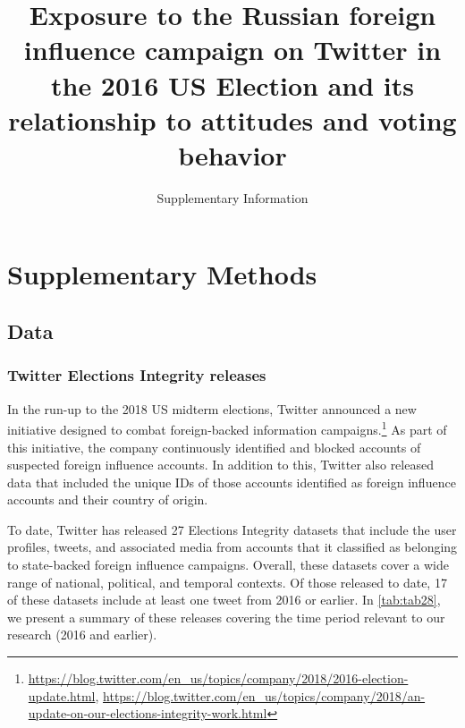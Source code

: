 \documentclass[
  12pt,
]{article}
\title{\Large \textbf{Exposure to the Russian foreign influence campaign on Twitter in the 2016 US Election and its relationship to attitudes and voting behavior}\vspace{2mm}}
\subtitle{\Large Supplementary Information}
\author{}
\date{\vspace{-2.5em}}
\begin{document}
\maketitle

{
\setcounter{tocdepth}{2}
\tableofcontents
}
\renewcommand{\figureautorefname}{Supplementary Figure}
\renewcommand{\tableautorefname}{Supplementary Table}

\clearpage

\hypertarget{supplementary-methods}{%
\section{Supplementary Methods}\label{supplementary-methods}}

\hypertarget{data}{%
\subsection{Data}\label{data}}

\hypertarget{twitter-elections-integrity-releases}{%
\subsubsection{Twitter Elections Integrity releases}\label{twitter-elections-integrity-releases}}

In the run-up to the 2018 US midterm elections, Twitter announced a new initiative designed to combat foreign-backed information campaigns.\footnote{\url{https://blog.twitter.com/en_us/topics/company/2018/2016-election-update.html}, \url{https://blog.twitter.com/en_us/topics/company/2018/an-update-on-our-elections-integrity-work.html}} As part of this initiative, the company continuously identified and blocked accounts of suspected foreign influence accounts. In addition to this, Twitter also released data that included the unique IDs of those accounts identified as foreign influence accounts and their country of origin.

To date, Twitter has released 27 Elections Integrity datasets that include the user profiles, tweets, and associated media from accounts that it classified as belonging to state-backed foreign influence campaigns. Overall, these datasets cover a wide range of national, political, and temporal contexts. Of those released to date, 17 of these datasets include at least one tweet from 2016 or earlier. In \autoref{tab:tab28}, we present a summary of these releases covering the time period relevant to our research (2016 and earlier).
\end{document}
